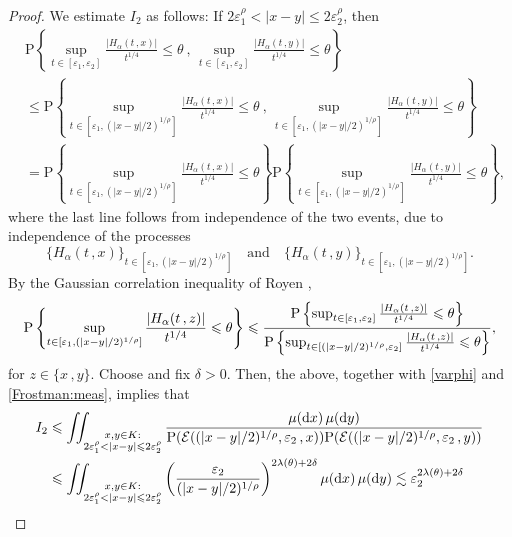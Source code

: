 \documentclass[reqno]{amsart}
\newcommand{\<}{\langle}
\renewcommand{\>}{\rangle}
\renewcommand{\P}{\mathrm{P}}
\newcommand{\1}{\mathbb{1}}
\renewcommand{\d}{{\rm d}}
\renewcommand{\le}{\leqslant}
\theoremstyle{definition}
\numberwithin{equation}{section}
\begin{document}
\begin{proof}
	We estimate $I_2$ as follows: 
	If $2\varepsilon_1^\rho < |x-y| \le 2\varepsilon_2^\rho$, then 
	\begin{align*}
		&\P\left\{ \sup_{t \in [\varepsilon_1,\varepsilon_2]} 
			\frac{|H_\alpha(t\,,x)|}{t^{1/4}} \le \theta\ , \, 
			\sup_{t \in [\varepsilon_1,\varepsilon_2]} 
			\frac{|H_\alpha(t\,,y)|}{t^{1/4}} \le \theta \right\}\\
		& \le \P\left\{ \sup_{t \in [\varepsilon_1, (|x-y|/2)^{1/\rho}]} 
			\frac{|H_\alpha(t\,,x)|}{t^{1/4}} \le \theta \ , \, 
			\sup_{t\in [\varepsilon_1,(|x-y|/2)^{1/\rho}]} 
			\frac{|H_\alpha(t\,,y)|}{t^{1/4}} \le \theta \right\}\\
		&= \P\left\{ \sup_{t \in [\varepsilon_1, (|x-y|/2)^{1/\rho}]} 
			\frac{|H_\alpha(t\,,x)|}{t^{1/4}} \le \theta \right\} 
			\P\left\{ \sup_{t\in [\varepsilon_1,(|x-y|/2)^{1/\rho}]} 
			\frac{|H_\alpha(t\,,y)|}{t^{1/4}} \le \theta \right\},
	\end{align*}
	where the last line follows from independence of the two events, 
	due to independence of the processes
	\[
		\{ H_\alpha(t\,,x) \}_{t \in [\varepsilon_1, (|x-y|/2)^{1/\rho}]} \quad \text{and} \quad 
		\{ H_\alpha(t\,,y) \}_{t \in [\varepsilon_1, (|x-y|/2)^{1/\rho}]}.
	\]
	By the Gaussian correlation inequality of Royen \cite{Royen},
	\begin{align*}
		\P\left\{ \sup_{t \in [\varepsilon_1, (|x-y|/2)^{1/\rho}]} 
		\frac{|H_\alpha(t\,,z)|}{t^{1/4}} \le \theta \right\} \le  
		\frac{\P\left\{ \sup_{t \in [\varepsilon_1, \varepsilon_2]} 
		\frac{|H_\alpha(t\,,z)|}{t^{1/4}} \le \theta \right\}}{%
		\P\left\{ \sup_{t \in [(|x-y|/2)^{1/\rho}, \varepsilon_2]} 
		\frac{|H_\alpha(t\,,z)|}{t^{1/4}} \le \theta \right\}},
	\end{align*}
	for $z \in \{x\,,y\}$.
	Choose and fix $\delta>0$.
	Then, the above, together with \eqref{varphi} and \eqref{Frostman:meas}, implies that
	\begin{align*}
		I_2 & \le \iint_{\substack{x,y \in K: \\ 2\varepsilon_1^\rho 
			< |x-y| \le 2\varepsilon_2^\rho}} \frac{\mu(\d x)\, \mu(\d y)}{%
			\P(\mathcal{E}((|x-y|/2)^{1/\rho}, \varepsilon_2 \,, x) ) 
			\P( \mathcal{E}((|x-y|/2)^{1/\rho}, \varepsilon_2\,,y) )}\\
		& \le \iint_{\substack{x,y \in K: \\ 2\varepsilon_1^\rho < |x-y| 
			\le 2\varepsilon_2^\rho}}  \left( \frac{\varepsilon_2}{%
			(|x-y|/2)^{1/\rho}} \right)^{2\lambda(\theta)+2\delta} 
			\mu(\d x) \, \mu(\d y)
			\lesssim \varepsilon_2^{2\lambda(\theta)+2\delta} 

\end{align*}
\end{proof}
\end{document}

